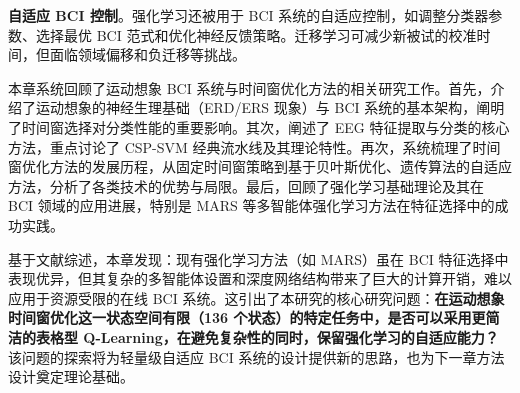 \textbf{自适应 BCI 控制}。强化学习还被用于 BCI 系统的自适应控制，如调整分类器参数、选择最优 BCI 范式和优化神经反馈策略\cite{jayaram2016transfer}。迁移学习可减少新被试的校准时间，但面临领域偏移和负迁移等挑战。

本章系统回顾了运动想象 BCI 系统与时间窗优化方法的相关研究工作。首先，介绍了运动想象的神经生理基础（ERD/ERS 现象）与 BCI 系统的基本架构，阐明了时间窗选择对分类性能的重要影响。其次，阐述了 EEG 特征提取与分类的核心方法，重点讨论了 CSP-SVM 经典流水线及其理论特性。再次，系统梳理了时间窗优化方法的发展历程，从固定时间窗策略到基于贝叶斯优化、遗传算法的自适应方法，分析了各类技术的优势与局限。最后，回顾了强化学习基础理论及其在 BCI 领域的应用进展，特别是 MARS 等多智能体强化学习方法在特征选择中的成功实践。

基于文献综述，本章发现：现有强化学习方法（如 MARS）虽在 BCI 特征选择中表现优异，但其复杂的多智能体设置和深度网络结构带来了巨大的计算开销，难以应用于资源受限的在线 BCI 系统。这引出了本研究的核心研究问题：\textbf{在运动想象时间窗优化这一状态空间有限（136 个状态）的特定任务中，是否可以采用更简洁的表格型 Q-Learning，在避免复杂性的同时，保留强化学习的自适应能力？} 该问题的探索将为轻量级自适应 BCI 系统的设计提供新的思路，也为下一章方法设计奠定理论基础。


